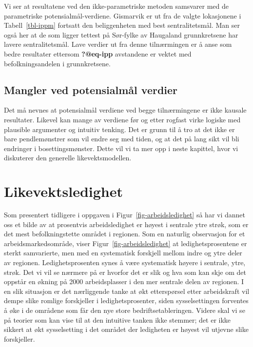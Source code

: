 \documentclass[
]{article}
\begin{document}
Vi ser at resultatene ved den ikke-parametriske metoden samsvarer med de
parametriske potensialmål-verdiene. Gismarvik er ut fra de valgte
lokasjonene i Tabell~\ref{tbl-ippm} fortsatt den beliggenheten med best
sentralitetsmål. Man ser også her at de som ligger tettest på Sør-fylke
av Haugaland grunnkretsene har lavere sentralitetsmål. Lave verdier ut
fra denne tilnærmingen er å anse som bedre resultater ettersom
\textbf{?@eq-ipp} avstandene er vektet med befolkningsandelen i
grunnkretsene.

\hypertarget{mangler-ved-potensialmuxe5l-verdier}{%
\subsection{Mangler ved potensialmål
verdier}\label{mangler-ved-potensialmuxe5l-verdier}}

Det må nevnes at potensialmål verdiene ved begge tilnærmingene er ikke
kausale resultater. Likevel kan mange av verdiene før og etter rogfast
virke logiske med plausible argumenter og intuitiv tenking. Det er grunn
til å tro at det ikke er bare pendlemønstrer som vil endre seg med
tiden, og at det på lang sikt vil bli endringer i bosettingsmønster.
Dette vil vi ta mer opp i neste kapittel, hvor vi diskuterer den
generelle likevektsmodellen.

\newpage

\hypertarget{likevektsledighet}{%
\section{Likevektsledighet}\label{likevektsledighet}}

Som presentert tidligere i oppgaven i Figur~\ref{fig-arbeidsledighet} så
har vi dannet oss et bilde av at prosentvis arbeidsledighet er høyest i
sentrale ytre strøk, som er det mest befolkningstette området i
regionen. Som en naturlig observasjon for et arbeidsmarkedsområde, viser
Figur~\ref{fig-arbeidsledighet} at ledighetsprosentene er sterkt
samvarierte, men med en systematisk forskjell mellom indre og ytre deler
av regionen. Ledighetsprosenten synes å være systematisk høyere i
sentrale, ytre, strøk. Det vi vil se nærmere på er hvorfor det er slik
og hva som kan skje om det oppstår en økning på 2000 arbeidsplasser i
den mer sentrale delen av regionen. I en slik situasjon er det
nærliggende tanke at økt etterspørsel etter arbeidskraft vil dempe slike
romlige forskjeller i ledighetsprosenter, siden sysselsettingen
forventes å øke i de områdene som får den nye store
bedriftsetableringen. Videre skal vi se på teorier som kan vise til at
den intuitive tanken ikke stemmer; det er ikke sikkert at økt
sysselsetting i det området der ledigheten er høyest vil utjevne slike
forskjeller.
\end{document}
